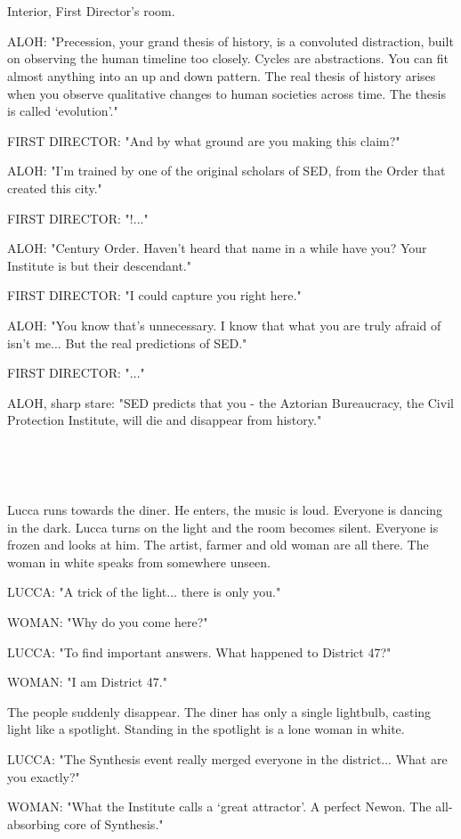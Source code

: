 \documentclass[11pt]{article}
\begin{document}
\ 

\ 

Interior, First Director's room.

ALOH: "Precession, your grand thesis of history, is a convoluted distraction, built on observing the human timeline too closely.
Cycles are abstractions. You can fit almost anything into an up and down pattern.
The real thesis of history arises when you observe qualitative changes to human societies across time.
The thesis is called `evolution'."

FIRST DIRECTOR: "And by what ground are you making this claim?"

ALOH: "I'm trained by one of the original scholars of SED, from the Order that created this city."

FIRST DIRECTOR: "!..."

ALOH: "Century Order. Haven't heard that name in a while have you?
Your Institute is but their descendant."

FIRST DIRECTOR: "I could capture you right here."

ALOH: "You know that's unnecessary.
I know that what you are truly afraid of isn't me...
But the real predictions of SED."

FIRST DIRECTOR: "..."

ALOH, sharp stare: "SED predicts that you - the Aztorian Bureaucracy, the Civil Protection Institute, will die and disappear from history."

\ 

\ 

Lucca runs towards the diner.
He enters, the music is loud.
Everyone is dancing in the dark.
Lucca turns on the light and the room becomes silent. 
Everyone is frozen and looks at him.
The artist, farmer and old woman are all there.
The woman in white speaks from somewhere unseen.

LUCCA: "A trick of the light... there is only you."

WOMAN: "Why do you come here?"

LUCCA: "To find important answers.
What happened to District 47?"

WOMAN: "I am District 47."

The people suddenly disappear.
The diner has only a single lightbulb, casting light like a spotlight.
Standing in the spotlight is a lone woman in white.

LUCCA: "The Synthesis event really merged everyone in the district...
What are you exactly?"

WOMAN: "What the Institute calls a `great attractor'.
A perfect Newon.
The all-absorbing core of Synthesis."
\end{document}
